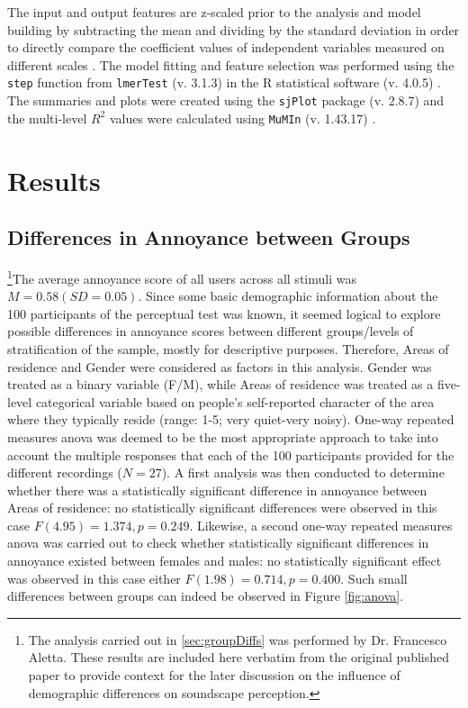 The input and output features are z-scaled prior to the analysis and model building by subtracting the mean and dividing by the standard deviation in order to directly compare the coefficient values of independent variables measured on different scales \citep{Harrison2018brief}. The model fitting and feature selection was performed using the \texttt{step} function from \texttt{lmerTest} (v. 3.1.3) \citep{Kuznetsova2017lmerTest} in the R statistical software (v. 4.0.5) \citep{RCT2018R}. The summaries and plots were created using the \texttt{sjPlot} package (v. 2.8.7) \citep{Luedecke2021sjPlot} and the multi-level $R^2$ values were calculated using \texttt{MuMIn} (v. 1.43.17) \citep{Barton2020MuMIN}.


\section{Results}

\subsection{Differences in Annoyance between Groups \label{sec:groupDiffs}}

\footnote{The analysis carried out in \cref{sec:groupDiffs} was performed by Dr. Francesco Aletta. These results are included here verbatim from the original published paper to provide context for the later discussion on the influence of demographic differences on soundscape perception.}The average annoyance score of all users across all stimuli was $M=0.58 (SD=0.05)$. Since some basic demographic information about the 100 participants of the perceptual test was known, it seemed logical to explore possible differences in annoyance scores between different groups/levels of stratification of the sample, mostly for descriptive purposes. Therefore, Areas of residence and Gender were considered as factors in this analysis. Gender was treated as a binary variable (F/M), while Areas of residence was treated as a five-level categorical variable based on people's self-reported character of the area where they typically reside (range: 1-5; very quiet-very noisy). One-way repeated measures \gls{anova} was deemed to be the most appropriate approach to take into account the multiple responses that each of the 100 participants provided for the different recordings ($N=27$). A first analysis was then conducted to determine whether there was a statistically significant difference in annoyance between Areas of residence: no statistically significant differences were observed in this case $F(4.95)=1.374, p=0.249$. Likewise, a second one-way repeated measures \gls{anova} was carried out to check whether statistically significant differences in annoyance existed between females and males: no statistically significant effect was observed in this case either $F(1.98)=0.714, p=0.400$. Such small differences between groups can indeed be observed in Figure \ref{fig:anova}.

